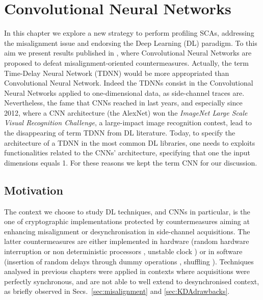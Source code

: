 
\chapter{Convolutional Neural Networks} %
\label{ChapterCNN}


In this chapter we explore a new strategy to perform profiling SCAs, addressing the misalignment issue and endorsing the Deep Learning (DL) paradigm. To this aim we present results published in \cite{DBLP:conf/ches/CagliDP17}, where Convolutional Neural Networks are proposed to defeat misalignment-oriented countermeasures. Actually, the term Time-Delay Neural Network (TDNN) would be more appropriated than Convolutional Neural Network. Indeed the TDNNs  \cite{lang1990time} consist in the Convolutional Neural Networks applied to one-dimensional data, as side-channel traces are. Nevertheless, the fame that CNNs reached in last years, and especially since 2012, where a CNN architecture (the \textquotedbl AlexNet\textquotedbl) \cite{KSH12}  won the \emph{ImageNet Large Scale Visual Recognition Challenge}, a large-impact image recognition contest, lead to the disappearing of term TDNN from DL literature. Today, to specify the architecture of a TDNN in the most common DL libraries, one needs to exploits functionalities related to the CNNs' architecture, specifying \eg that one the input dimensions equals 1. For these reasons we kept the term CNN for our discussion. 

\section{Motivation}
The context we choose to study DL techniques, and CNNs in particular, is the one of cryptographic implementations protected by countermeasures aiming at enhancing misalignment or desynchronisation in side-channel acquisitions. The latter countermeasures are either implemented in hardware (random hardware interruption or non deterministic processors \cite{irwin2002instruction,may2001non}, unstable clock \cite{moore2002improving,moore2003balanced}) or in software (insertion of random delays through dummy operations \cite{coron2009efficient,coron2010analysis}, shuffling \cite{veyrat2012shuffling}). Techniques analysed in previous chapters were applied in contexts where acquisitions were perfectly synchronous, and are not able to well extend to desynchronised context, as briefly observed in Secs.~\ref{sec:misalignment} and \ref{sec:KDAdrawbacks}.\\


